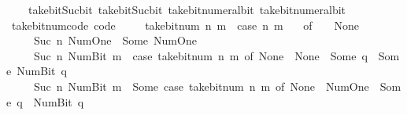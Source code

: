 \begin{isabellebody}
\ \ \ \ take{\isacharunderscore}{\kern0pt}bit{\isacharunderscore}{\kern0pt}Suc{\isacharunderscore}{\kern0pt}bit{}\ take{\isacharunderscore}{\kern0pt}bit{\isacharunderscore}{\kern0pt}Suc{\isacharunderscore}{\kern0pt}bit{}\ take{\isacharunderscore}{\kern0pt}bit{\isacharunderscore}{\kern0pt}numeral{\isacharunderscore}{\kern0pt}bit{}\ take{\isacharunderscore}{\kern0pt}bit{\isacharunderscore}{\kern0pt}numeral{\isacharunderscore}{\kern0pt}bit{}{\isacharparenright}{\kern0pt}%
\endisatagproof
{\isafoldproof}%
%
\isadelimproof
\isanewline
%
\endisadelimproof
\isanewline
{}\isamarkupfalse%
\ take{\isacharunderscore}{\kern0pt}bit{\isacharunderscore}{\kern0pt}num{\isacharunderscore}{\kern0pt}code\ {\isacharbrackleft}{\kern0pt}code{\isacharbrackright}{\kern0pt}{\isacharcolon}{\kern0pt}\isanewline
\ \ %
\isanewline
\ \ {\isacartoucheopen}take{\isacharunderscore}{\kern0pt}bit{\isacharunderscore}{\kern0pt}num\ n\ m\ {\isacharequal}{\kern0pt}\ {\isacharparenleft}{\kern0pt}case\ {\isacharparenleft}{\kern0pt}n{\isacharcomma}{\kern0pt}\ m{\isacharparenright}{\kern0pt}\isanewline
\ \ \ of\ {\isacharparenleft}{\kern0pt}{}{\isacharcomma}{\kern0pt}\ {\isacharunderscore}{\kern0pt}{\isacharparenright}{\kern0pt}\ {\isasymRightarrow}\ None\isanewline
\ \ \ \ {\isacharbar}{\kern0pt}\ {\isacharparenleft}{\kern0pt}Suc\ n{\isacharcomma}{\kern0pt}\ Num{\isachardot}{\kern0pt}One{\isacharparenright}{\kern0pt}\ {\isasymRightarrow}\ Some\ Num{\isachardot}{\kern0pt}One\isanewline
\ \ \ \ {\isacharbar}{\kern0pt}\ {\isacharparenleft}{\kern0pt}Suc\ n{\isacharcomma}{\kern0pt}\ Num{\isachardot}{\kern0pt}Bit{}\ m{\isacharparenright}{\kern0pt}\ {\isasymRightarrow}\ {\isacharparenleft}{\kern0pt}case\ take{\isacharunderscore}{\kern0pt}bit{\isacharunderscore}{\kern0pt}num\ n\ m\ of\ None\ {\isasymRightarrow}\ None\ {\isacharbar}{\kern0pt}\ Some\ q\ {\isasymRightarrow}\ Some\ {\isacharparenleft}{\kern0pt}Num{\isachardot}{\kern0pt}Bit{}\ q{\isacharparenright}{\kern0pt}{\isacharparenright}{\kern0pt}\isanewline
\ \ \ \ {\isacharbar}{\kern0pt}\ {\isacharparenleft}{\kern0pt}Suc\ n{\isacharcomma}{\kern0pt}\ Num{\isachardot}{\kern0pt}Bit{}\ m{\isacharparenright}{\kern0pt}\ {\isasymRightarrow}\ Some\ {\isacharparenleft}{\kern0pt}case\ take{\isacharunderscore}{\kern0pt}bit{\isacharunderscore}{\kern0pt}num\ n\ m\ of\ None\ {\isasymRightarrow}\ Num{\isachardot}{\kern0pt}One\ {\isacharbar}{\kern0pt}\ Some\ q\ {\isasymRightarrow}\ Num{\isachardot}{\kern0pt}Bit{}\ q{\isacharparenright}{\kern0pt}{\isacharparenright}{\kern0pt}{\isacartoucheclose}\isanewline

\end{isabellebody}
